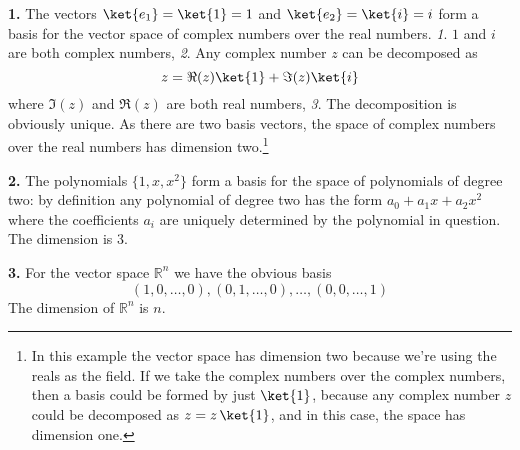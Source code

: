 \textbf{1.} The vectors $\ket{e_1} = \ket{1} = 1$ and $\ket{e_2} = \ket{i} = i$ form a basis for the vector space of complex numbers over the real numbers.
\emph{1}. $1$ and $i$ are both complex numbers, \emph{2}. Any complex number $z$ can be decomposed as
\begin{displaymath}
  z = \Re(z) \ket{1} + \Im(z) \ket{i}
\end{displaymath}
where $\Im(z)$ and $\Re(z)$ are both real numbers, \emph{3}. The decomposition is obviously unique.
As there are two basis vectors, the space of complex numbers over the real numbers has dimension two.\footnote{In this example the vector space has dimension two because we're using the reals as the field.
If we take the complex numbers over the complex numbers, then a basis could be formed by just $\ket{1}$, because any complex number $z$ could be decomposed as $z = z\,\ket{1}$, and in this case, the space has dimension one.}\newline

\noindent \textbf{2.} The polynomials $\{1, x,x^{2}\}$ form a basis for the space of polynomials of degree two: by definition any polynomial of degree two has the form $a_0 + a_1 x + a_2 x^2$ where the coefficients $a_i$ are uniquely determined by the polynomial in question.
The dimension is 3.\newline

\noindent \textbf{3.} For the vector space $\mathbb{R}^n$ we have the obvious basis
\begin{displaymath}
  (1,0,\ldots ,0), (0,1,\ldots ,0), \ldots , (0,0,\ldots ,1)
\end{displaymath}
The dimension of $\mathbb{R}^n$ is $n$.\newline

